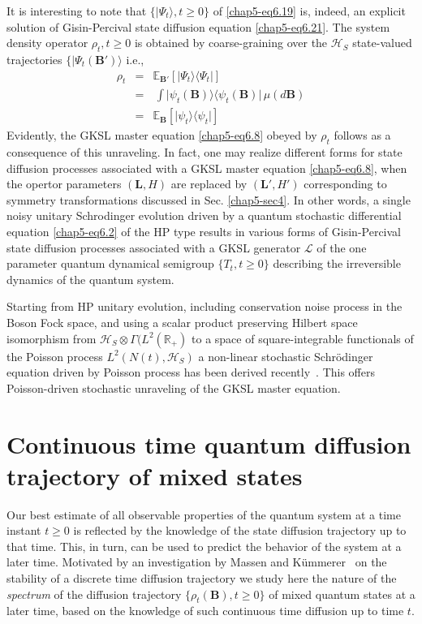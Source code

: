 It is interesting to note that $\{\vert\Psi_t\rangle, t\geq 0\}$ of \eqref{chap5-eq6.19} is, indeed, an explicit solution of Gisin-Percival state diffusion equation \eqref{chap5-eq6.21}. The system density operator $\rho_t, t\geq 0$ is obtained by coarse-graining over the $\mathcal{H}_S$ state-valued trajectories $\{\vert\Psi_t(\mathbf{B}')\rangle$ i.e.,   
\begin{eqnarray} 
		\rho_t&=&\mathbb{E}_{\mathbf{B}'}[\vert\Psi_t\rangle\langle\Psi_t\vert] \nonumber \\ 
		&=&\, \int \vert\psi_t(\mathbf{B})\rangle\langle\psi_t(\mathbf{B})\vert\,  
		\mu(d\mathbf{B}) \nonumber \\ 
		&=& \mathbb{E}_{\mathbf{B}}[\vert\psi_t\rangle\langle\psi_t\vert] \label{chap5-eq6.24}
\end{eqnarray}
Evidently, the GKSL master equation \eqref{chap5-eq6.8} obeyed by  $\rho_t$ follows as a consequence of this unraveling. In fact, one may realize different forms for state diffusion processes associated with a GKSL master equation \eqref{chap5-eq6.8}, when the opertor parameters $(\mathbf{L}, H)$ are replaced by $(\mathbf{L}', H')$ corresponding to symmetry transformations discussed in Sec. \ref{chap5-sec4}. In other words, a single noisy unitary Schrodinger evolution driven by a quantum stochastic differential equation \eqref{chap5-eq6.2} of the HP type results in various forms of Gisin-Percival state diffusion processes associated with a GKSL generator $\mathcal{L}$ of the one parameter quantum dynamical semigroup  $\{T_t, t\geq 0\}$ describing the irreversible dynamics of the  quantum system.  

Starting from  HP unitary evolution, including  conservation noise process in the Boson Fock space, and using a scalar product preserving Hilbert space isomorphism from  $\mathcal{H}_S\otimes\Gamma(L^2(\mathbb{R}_+)$ to a space  of square-integrable functionals of the Poisson process $L^2(N(t),\mathcal{H}_S)$ a non-linear stochastic Schr{\"o}dinger equation driven by Poisson process has been derived recently~\cite{key45}. This offers Poisson-driven stochastic unraveling of the GKSL master equation.         

\section{Continuous time quantum diffusion trajectory of  mixed states}\label{chap5-sec7}

Our best estimate of all observable properties of the quantum system at a time instant $t\geq 0$ is reflected by the knowledge of the state diffusion trajectory up to that time. This, in turn, can be used  to predict the behavior of the system at a later time. Motivated by an investigation by Massen and K{\"u}mmerer~\cite{key36} on the stability of a discrete time diffusion trajectory  we study here the nature of the {\em spectrum} of the diffusion trajectory $\{\rho_t(\mathbf{B}),t \geq 0\}$ of mixed quantum states at a later time, based on the knowledge of such continuous time diffusion up to time $t$.

